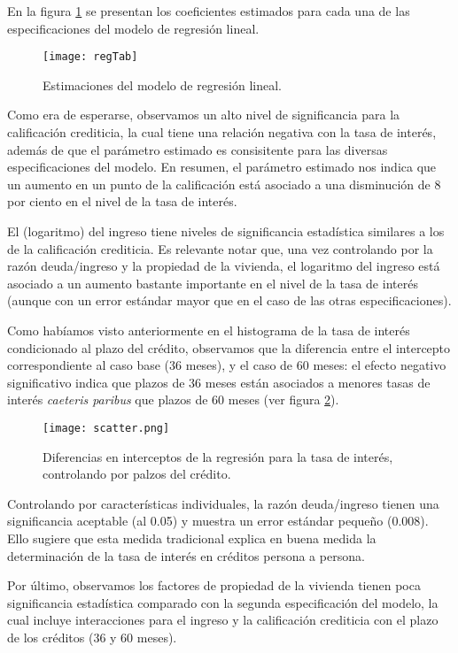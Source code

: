 \documentclass[12pt, fleqn, letterpaper, oneside]{amsart}
\begin{document}
En la figura \ref{estimates} se presentan los coeficientes estimados para cada una de las especificaciones del modelo de regresión lineal.

\begin{figure}[h!]
	\texttt{[image: regTab]} \caption{Estimaciones del modelo de regresión lineal. \label{estimates}}
\end{figure}

Como era de esperarse, observamos un alto nivel de significancia para la calificación crediticia, la cual tiene una relación negativa con la tasa de interés, además de que el parámetro estimado es consisitente para las diversas especificaciones del modelo. En resumen, el parámetro estimado nos indica que un aumento en un punto de la calificación está asociado a una disminución de 8 por ciento en el nivel de la tasa de interés. 

El (logaritmo) del ingreso tiene niveles de significancia estadística similares a los de la calificación crediticia. Es relevante notar que, una vez controlando por la razón deuda/ingreso y la propiedad de la vivienda, el logaritmo del ingreso está asociado a un aumento bastante importante en el nivel de la tasa de interés (aunque con un error estándar mayor que en el caso de las otras especificaciones).

Como habíamos visto anteriormente en el histograma de la tasa de interés condicionado al plazo del crédito, observamos que la diferencia entre el intercepto correspondiente al caso base (36 meses), y el caso de 60 meses: el efecto negativo significativo indica que plazos de 36 meses están asociados a menores tasas de interés \emph{caeteris paribus} que plazos de 60 meses (ver figura \ref{scatter}).

\begin{figure}[h!]
	\texttt{[image: scatter.png]}
	\caption{Diferencias en interceptos de la regresión para la tasa de interés, controlando por palzos del crédito. \label{scatter}}
\end{figure}

Controlando por características individuales, la razón deuda/ingreso tienen una significancia aceptable (al 0.05) y muestra un error estándar pequeño (0.008). Ello sugiere que esta medida tradicional explica en buena medida la determinación de la tasa de interés en créditos persona a persona. 

Por último, observamos los factores de propiedad de la vivienda tienen poca significancia estadística comparado con la segunda especificación del modelo, la cual incluye interacciones para el ingreso y la calificación crediticia con el plazo de los créditos (36 y 60 meses). 
\end{document}
